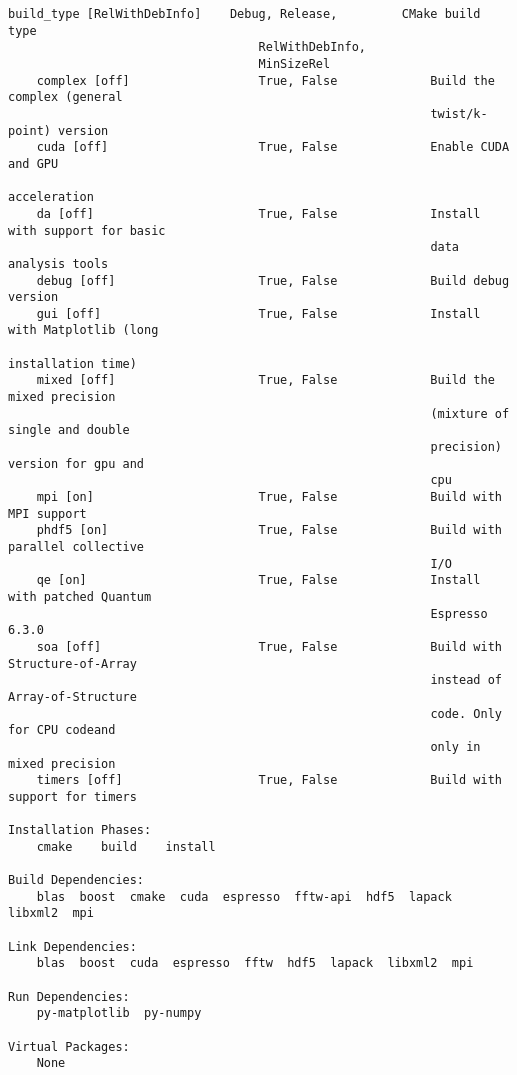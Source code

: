 \begin{lstlisting}[style=SHELL]
    build_type [RelWithDebInfo]    Debug, Release,         CMake build type
                                   RelWithDebInfo,
                                   MinSizeRel
    complex [off]                  True, False             Build the complex (general
                                                           twist/k-point) version
    cuda [off]                     True, False             Enable CUDA and GPU
                                                           acceleration
    da [off]                       True, False             Install with support for basic
                                                           data analysis tools
    debug [off]                    True, False             Build debug version
    gui [off]                      True, False             Install with Matplotlib (long
                                                           installation time)
    mixed [off]                    True, False             Build the mixed precision
                                                           (mixture of single and double
                                                           precision) version for gpu and
                                                           cpu
    mpi [on]                       True, False             Build with MPI support
    phdf5 [on]                     True, False             Build with parallel collective
                                                           I/O
    qe [on]                        True, False             Install with patched Quantum
                                                           Espresso 6.3.0
    soa [off]                      True, False             Build with Structure-of-Array
                                                           instead of Array-of-Structure
                                                           code. Only for CPU codeand
                                                           only in mixed precision
    timers [off]                   True, False             Build with support for timers

Installation Phases:
    cmake    build    install

Build Dependencies:
    blas  boost  cmake  cuda  espresso  fftw-api  hdf5  lapack  libxml2  mpi

Link Dependencies:
    blas  boost  cuda  espresso  fftw  hdf5  lapack  libxml2  mpi

Run Dependencies:
    py-matplotlib  py-numpy

Virtual Packages:
    None
\end{lstlisting}

